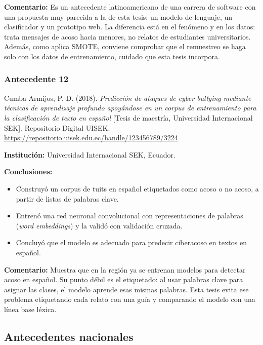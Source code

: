 \noindent\textbf{Comentario:} Es un antecedente latinoamericano de una carrera de software con una propuesta muy parecida a la de esta tesis: un modelo de lenguaje, un clasificador y un prototipo web. La diferencia está en el fenómeno y en los datos: trata mensajes de acoso hacia menores, no relatos de estudiantes universitarios. Además, como aplica SMOTE, conviene comprobar que el remuestreo se haga solo con los datos de entrenamiento, cuidado que esta tesis incorpora.

\subsubsection{Antecedente 12}
\noindent Cumba Armijos, P. D. (2018). \textit{Predicción de ataques de cyber bullying mediante técnicas de aprendizaje profundo apoyándose en un corpus de entrenamiento para la clasificación de texto en español} [Tesis de maestría, Universidad Internacional SEK]. Repositorio Digital UISEK. \url{https://repositorio.uisek.edu.ec/handle/123456789/3224}

\noindent\textbf{Institución:} Universidad Internacional SEK, Ecuador.

\noindent\textbf{Conclusiones:}
\begin{itemize}
	\item Construyó un corpus de tuits en español etiquetados como acoso o no acoso, a partir de listas de palabras clave.
	\item Entrenó una red neuronal convolucional con representaciones de palabras (\textit{word embeddings}) y la validó con validación cruzada.
	\item Concluyó que el modelo es adecuado para predecir ciberacoso en textos en español.
\end{itemize}

\noindent\textbf{Comentario:} Muestra que en la región ya se entrenan modelos para detectar acoso en español. Su punto débil es el etiquetado: al usar palabras clave para asignar las clases, el modelo aprende esas mismas palabras. Esta tesis evita ese problema etiquetando cada relato con una guía y comparando el modelo con una línea base léxica.

\subsection{Antecedentes nacionales}

